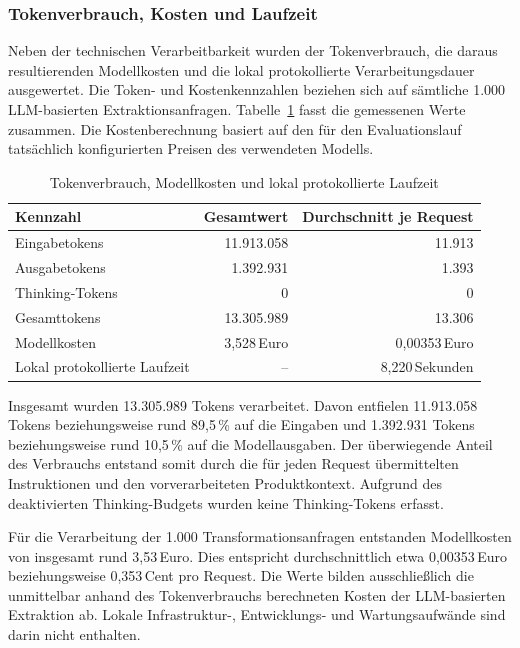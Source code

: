 \subsubsection{Tokenverbrauch, Kosten und Laufzeit}

Neben der technischen Verarbeitbarkeit wurden der Tokenverbrauch, die daraus resultierenden Modellkosten und die lokal protokollierte Verarbeitungsdauer ausgewertet. Die Token- und Kostenkennzahlen beziehen sich auf sämtliche 1.000 LLM-basierten Extraktionsanfragen. Tabelle~\ref{tab:llm-effizienz} fasst die gemessenen Werte zusammen. Die Kostenberechnung basiert auf den für den Evaluationslauf tatsächlich konfigurierten Preisen des verwendeten Modells.

\begin{table}[htbp]
    \centering
    \small
    \begin{tabular}{p{} r r}
        \hline
        \textbf{Kennzahl} &
        \textbf{Gesamtwert} &
        \textbf{Durchschnitt je Request} \\
        \hline
        Eingabetokens & 11.913.058 & 11.913 \\
        Ausgabetokens & 1.392.931 & 1.393 \\
        Thinking-Tokens & 0 & 0 \\
        Gesamttokens & 13.305.989 & 13.306 \\
        Modellkosten & 3,528\,Euro & 0,00353\,Euro \\
        Lokal protokollierte Laufzeit & -- & 8,220\,Sekunden \\
        \hline
    \end{tabular}
    \caption{Tokenverbrauch, Modellkosten und lokal protokollierte Laufzeit}
    \label{tab:llm-effizienz}
\end{table}

Insgesamt wurden 13.305.989 Tokens verarbeitet. Davon entfielen 11.913.058 Tokens beziehungsweise rund 89,5\,\% auf die Eingaben und 1.392.931 Tokens beziehungsweise rund 10,5\,\% auf die Modellausgaben. Der überwiegende Anteil des Verbrauchs entstand somit durch die für jeden Request übermittelten Instruktionen und den vorverarbeiteten Produktkontext. Aufgrund des deaktivierten Thinking-Budgets wurden keine Thinking-Tokens erfasst.

Für die Verarbeitung der 1.000 Transformationsanfragen entstanden Modellkosten von insgesamt rund 3,53\,Euro. Dies entspricht durchschnittlich etwa 0,00353\,Euro beziehungsweise 0,353\,Cent pro Request. Die Werte bilden ausschließlich die unmittelbar anhand des Tokenverbrauchs berechneten Kosten der LLM-basierten Extraktion ab. Lokale Infrastruktur-, Entwicklungs- und Wartungsaufwände sind darin nicht enthalten.

